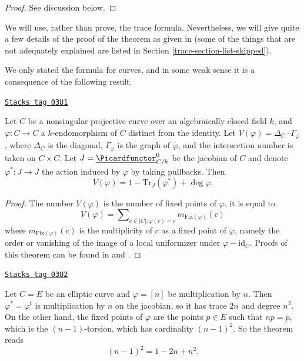 \begin{proof}
See discussion below.
\end{proof}

We will use, rather than prove, the trace formula. Nevertheless, we will
give quite a few details of the proof of the theorem as given in
\cite{SGA4.5} (some of the things that are not adequately explained
are listed in Section \ref{trace-section-list-skipped}).

\medskip\noindent
We only stated the formula for curves, and in some weak
sense it is a consequence of the following result.

\begin{theorem}[Weil]

\label{trace-theorem-weil-trace-formula}
\href{https://stacks.math.columbia.edu/tag/03U1}{\texttt{Stacks tag 03U1}}

Let $C$ be a nonsingular projective curve over an algebraically closed field
$k$, and $\varphi : C \to C$ a $k$-endomorphism of $C$ distinct from the
identity. Let $V(\varphi) = \Delta_C \cdot \Gamma_\varphi$, where $\Delta_C$ is
the diagonal, $\Gamma_\varphi$ is the graph of $\varphi$, and the intersection
number is taken on $C \times C$. Let $J = \underline{\Picardfunctor}^0_{C/k}$
be the jacobian of $C$ and denote $\varphi^* : J \to J$ the action induced by
$\varphi$ by taking pullbacks. Then
$$
V(\varphi) = 1 - \text{Tr}_J(\varphi^*) + \deg \varphi.
$$
\end{theorem}

\begin{proof}
The number $V(\varphi)$ is the number of fixed points of $\varphi$, it is equal
to
$$
V(\varphi) =
\sum\nolimits_{c \in |C| : \varphi(c) = c} m_{\text{Fix}(\varphi)} (c)
$$
where $m_{\text{Fix}(\varphi)} (c)$ is the multiplicity of $c$ as a fixed point
of $\varphi$, namely the order or vanishing of the image of a local uniformizer
under $\varphi - \text{id}_C$. Proofs of this theorem can be found in
\cite{Lang} and \cite{Weil}.
\end{proof}

\begin{example}
\label{trace-example-elliptic-curve}
\href{https://stacks.math.columbia.edu/tag/03U2}{\texttt{Stacks tag 03U2}}

Let $C = E$ be an elliptic curve and $\varphi = [n]$ be multiplication by $n$.
Then $\varphi^* = \varphi^t$ is multiplication by $n$ on the jacobian, so it
has trace $2n$ and degree $n^2$. On the other hand, the fixed points of
$\varphi$ are the points $p \in E$ such that $n p = p$, which is the
$(n-1)$-torsion, which has cardinality $(n-1)^2$. So the theorem reads
$$
(n-1)^2 = 1 - 2n + n^2.
$$
\end{example}

